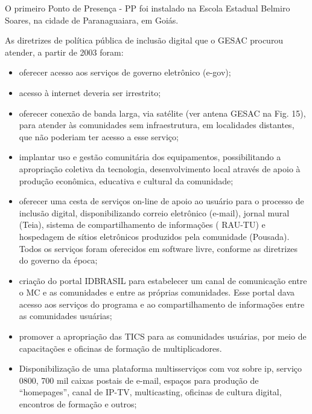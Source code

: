 O primeiro Ponto de Presença - PP foi  instalado na  Escola Estadual Belmiro Soares, na cidade de Paranaguaiara, em  Goiás.

As diretrizes de política pública de inclusão digital que o GESAC procurou atender, a partir de 2003 foram:


\begin{itemize}
\item oferecer acesso aos serviços de governo eletrônico (e-gov);
\item acesso à internet deveria ser irrestrito;
\item oferecer conexão de banda larga, via satélite (ver antena GESAC na Fig. 15), para atender às comunidades sem infraestrutura,  em localidades distantes, que não poderiam ter acesso a esse serviço;
\item implantar uso e gestão comunitária dos equipamentos, possibilitando a apropriação coletiva  da tecnologia,  desenvolvimento local através de apoio à produção econômica, educativa e cultural da comunidade;
\item oferecer uma cesta de serviços on-line de apoio ao usuário para o processo de inclusão digital, disponibilizando correio eletrônico (e-mail),  jornal mural (Teia), sistema de compartilhamento de informações ( RAU-TU) e hospedagem de sítios eletrônicos produzidos pela comunidade (Pousada). Todos os serviços  foram oferecidos em software livre, conforme as diretrizes do governo da época;
\item criação do portal IDBRASIL para estabelecer um canal de comunicação entre o MC e as comunidades e entre as próprias comunidades. Esse portal dava acesso aos serviços do programa e ao compartilhamento  de informações  entre as comunidades usuárias;
\item promover a apropriação das TICS  para as comunidades usuárias, por meio de  capacitações e oficinas de formação de multiplicadores.
\item Disponibilização de uma plataforma multisserviços com voz sobre ip, serviço 0800, 700 mil caixas postais de e-mail, espaços para produção de “homepages”, canal de IP-TV, multicasting, oficinas de cultura digital, encontros de formação e outros;
\end{itemize}



